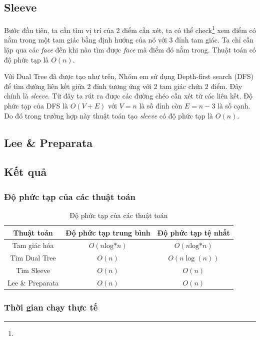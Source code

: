 \subsection{Sleeve}
Bước đầu tiên, ta cần tìm vị trí của 2 điểm cần xét, ta có thể check\footnote{} xem điểm có nằm trong một tam giác bằng định hướng của nó với 3 đỉnh tam giác. Ta chỉ cần lặp qua các \textit{face} đến khi nào tìm được \textit{face} mà điểm đó nằm trong. Thuật toán có độ phức tạp là $O(n)$.

Với Dual Tree đã được tạo như trên, Nhóm em sử dụng Depth-first search (DFS) để tìm đường liên kết giữa 2 đỉnh tương ứng với 2 tam giác chứa 2 điểm. Đây chính là \textit{sleeve}. Từ đây ta rút ra được các đường chéo cần xét từ các liên kết. Độ phức tạp của DFS là $O(V+E)$ với $V = n$ là số đỉnh còn $E = n - 3$ là số cạnh. Do đó trong trường hợp này thuật toán tạo \textit{sleeve} có độ phức tạp là $O(n)$.

\subsection{Lee \& Preparata}


\subsection{Kết quả}

\subsubsection{Độ phức tạp của các thuật toán}

\begin{table}[h]
    \centering
    \begin{tabular}{|c|c|c|}
    \hline
        \textbf{Thuật toán} & \textbf{Độ phức tạp trung bình}  & \textbf{Độ phức tạp tệ nhất}\\
    \hline
        Tam giác hóa & $O(n\text{log*}n)$ & $O(n\text{log*}n)$\\
    \hline
        Tìm Dual Tree & $O(n)$ & $O(n\log(n))$\\
    \hline
        Tìm Sleeve & $O(n)$ & $O(n)$ \\
    \hline
        Lee \& Preparata & $O(n)$ & $O(n)$\\
    \hline
    \end{tabular}
    \caption{Độ phức tạp của các thuật toán}
    \label{tab:complexity}

\subsubsection{Thời gian chạy thực tế}
\end{table}
